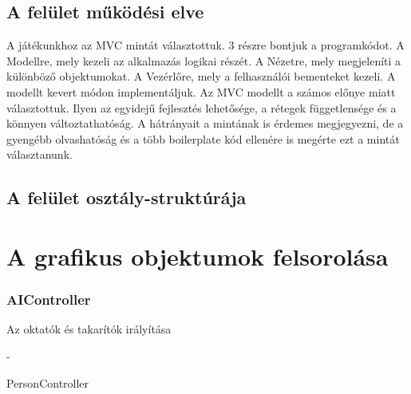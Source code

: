 \subsection{A felület működési elve}
A játékunkhoz az MVC mintát választottuk. 3 részre bontjuk a programkódot. A Modellre, mely kezeli az alkalmazás logikai részét. A Nézetre, mely megjeleníti a különböző objektumokat. A Vezérlőre, mely a felhasználói bementeket kezeli. 
A modellt kevert módon implementáljuk.
Az MVC modellt a számos előnye miatt választottuk. Ilyen az egyidejű fejlesztés lehetősége, a rétegek függetlensége és a könnyen változtathatóság. A hátrányait a mintának is érdemes megjegyezni, de a gyengébb olvashatóság és a több boilerplate kód ellenére is megérte ezt a mintát választanunk.

\subsection{A felület osztály-struktúrája}

\section{A grafikus objektumok felsorolása}


\subsubsection{AIController}
\begin{class-template-responsibility}
    Az oktatók és takarítók irályítása
\end{class-template-responsibility}
\begin{class-template-interface}
    -
\end{class-template-interface}
\begin{class-template-baseclass}
    PersonController
\end{class-template-baseclass}
\begin{class-template-attribute}
\end{class-template-attribute}
\begin{class-template-method}
\end{class-template-method}

